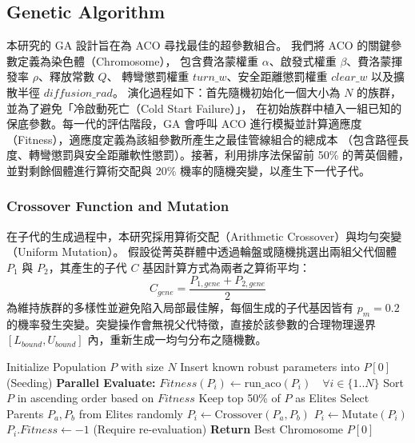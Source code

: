 \documentclass[conference]{IEEEtran}
\begin{document}
\subsection{Genetic Algorithm}
本研究的 GA 設計旨在為 ACO 尋找最佳的超參數組合。
我們將 ACO 的關鍵參數定義為染色體（Chromosome），
包含費洛蒙權重 $\alpha$、啟發式權重 $\beta$、費洛蒙揮發率 $\rho$、釋放常數 $Q$、
轉彎懲罰權重 $turn\_w$、安全距離懲罰權重 $clear\_w$ 以及擴散半徑 $diffusion\_rad$。
演化過程如下：首先隨機初始化一個大小為 $N$ 的族群，並為了避免「冷啟動死亡（Cold Start Failure）」，
在初始族群中植入一組已知的保底參數。每一代的評估階段，GA 會呼叫 ACO 
進行模擬並計算適應度（Fitness），適應度定義為該組參數所產生之最佳管線組合的總成本
（包含路徑長度、轉彎懲罰與安全距離軟性懲罰）。接著，利用排序法保留前 50\% 的菁英個體，
並對剩餘個體進行算術交配與 20\% 機率的隨機突變，以產生下一代子代。

\subsubsection{Crossover Function and Mutation}
在子代的生成過程中，本研究採用算術交配（Arithmetic Crossover）與均勻突變（Uniform Mutation）。
假設從菁英群體中透過輪盤或隨機挑選出兩組父代個體 $P_1$ 與 $P_2$，其產生的子代 $C$ 基因計算方式為兩者之算術平均：
\begin{equation}
C_{gene} = \frac{P_{1,gene} + P_{2,gene}}{2}
\end{equation}
為維持族群的多樣性並避免陷入局部最佳解，每個生成的子代基因皆有 $p_{m} = 0.2$ 的機率發生突變。突變操作會無視父代特徵，直接於該參數的合理物理邊界 $[L_{bound}, U_{bound}]$ 內，重新生成一均勻分布之隨機數。

\begin{algorithm}[!t]
\caption{Genetic Algorithm for ACO Hyperparameter Tuning}
\begin{algorithmic}[1]
\STATE Initialize Population $P$ with size $N$
\STATE Insert known robust parameters into $P[0]$ (Seeding)
    \STATE \textbf{Parallel Evaluate:} $Fitness(P_{i}) \leftarrow \text{run\_aco}(P_{i}) \quad \forall i \in \{1..N\}$
    \STATE Sort $P$ in ascending order based on $Fitness$
    \STATE Keep top 50\% of $P$ as Elites
        \STATE Select Parents $P_a, P_b$ from Elites randomly
        \STATE $P_{i} \leftarrow \text{Crossover}(P_a, P_b)$
            \STATE $P_{i} \leftarrow \text{Mutate}(P_{i})$
            \STATE $P_{i}.Fitness \leftarrow -1$ (Require re-evaluation)
        \ENDIF
    \ENDFOR
\ENDFOR
\STATE \textbf{Return} Best Chromosome $P[0]$
\end{algorithmic}
\end{algorithm}
\end{document}
